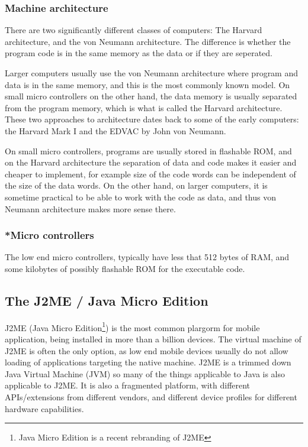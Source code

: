 \subsubsection{Machine architecture}
There are two significantly different classes of computers: The Harvard architecture, and the von Neumann architecture. The difference is whether the program code is in the same memory as the data or if they are seperated.

Larger computers usually use the von Neumann architecture where program and data is in the same memory, and this is the most commonly known model.
On small micro controllers on the other hand, the data memory is usually separated from the program memory, which is what is called the Harvard architecture. 
These two approaches to architecture dates back to some of the early computers: the Harvard Mark I\cite{harvard-mark1} and the EDVAC\cite{edvac} by John von Neumann.

On small micro controllers, programs are usually stored in flashable ROM, and on the Harvard architecture the separation of data and code makes it easier and cheaper to implement, for example size of the code words can be independent of the size of the data words.
On the other hand, on larger computers, it is sometime practical to be able to work with the code as data, and thus von Neumann architecture makes more sense there.


\subsubsection{*Micro controllers}
The low end micro controllers, typically have less that 512 bytes of RAM, and some kilobytes of possibly flashable ROM for the executable code. 




\subsection{The J2ME / Java Micro Edition}
J2ME (Java Micro Edition\footnote{Java Micro Edition is a recent rebranding of J2ME}) is the most common plargorm for mobile application, being installed in more than a billion devices. 
The virtual machine of J2ME is often the only option, as low end mobile devices usually do not allow loading of applications targeting the native machine.
J2ME is a trimmed down Java Virtual Machine (JVM) so many of the things applicable to Java is also applicable to J2ME. It is also a fragmented platform, with different APIs/extensions from different vendors, and different device profiles for different hardware capabilities.

